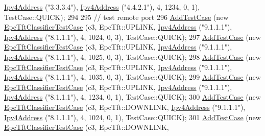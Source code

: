 \begin{DoxyCode}
      \hyperlink{classns3_1_1Ipv4Address}{Ipv4Address} (\textcolor{stringliteral}{"3.3.3.4"}), \hyperlink{classns3_1_1Ipv4Address}{Ipv4Address} (\textcolor{stringliteral}{"4.4.2.1"}),     4,     1234,     0,    1), 
      TestCase::QUICK);
294 
295   \textcolor{comment}{// test remote port}
296   \hyperlink{classns3_1_1TestCase_a3718088e3eefd5d6454569d2e0ddd835}{AddTestCase} (\textcolor{keyword}{new} \hyperlink{classEpcTftClassifierTestCase}{EpcTftClassifierTestCase} (c3, EpcTft::UPLINK,   
      \hyperlink{classns3_1_1Ipv4Address}{Ipv4Address} (\textcolor{stringliteral}{"9.1.1.1"}), \hyperlink{classns3_1_1Ipv4Address}{Ipv4Address} (\textcolor{stringliteral}{"8.1.1.1"}),     4,     1024,     0,    3), 
      TestCase::QUICK);
297   \hyperlink{classns3_1_1TestCase_a3718088e3eefd5d6454569d2e0ddd835}{AddTestCase} (\textcolor{keyword}{new} \hyperlink{classEpcTftClassifierTestCase}{EpcTftClassifierTestCase} (c3, EpcTft::UPLINK,   
      \hyperlink{classns3_1_1Ipv4Address}{Ipv4Address} (\textcolor{stringliteral}{"9.1.1.1"}), \hyperlink{classns3_1_1Ipv4Address}{Ipv4Address} (\textcolor{stringliteral}{"8.1.1.1"}),     4,     1025,     0,    3), 
      TestCase::QUICK);
298   \hyperlink{classns3_1_1TestCase_a3718088e3eefd5d6454569d2e0ddd835}{AddTestCase} (\textcolor{keyword}{new} \hyperlink{classEpcTftClassifierTestCase}{EpcTftClassifierTestCase} (c3, EpcTft::UPLINK,   
      \hyperlink{classns3_1_1Ipv4Address}{Ipv4Address} (\textcolor{stringliteral}{"9.1.1.1"}), \hyperlink{classns3_1_1Ipv4Address}{Ipv4Address} (\textcolor{stringliteral}{"8.1.1.1"}),     4,     1035,     0,    3), 
      TestCase::QUICK);
299   \hyperlink{classns3_1_1TestCase_a3718088e3eefd5d6454569d2e0ddd835}{AddTestCase} (\textcolor{keyword}{new} \hyperlink{classEpcTftClassifierTestCase}{EpcTftClassifierTestCase} (c3, EpcTft::UPLINK,   
      \hyperlink{classns3_1_1Ipv4Address}{Ipv4Address} (\textcolor{stringliteral}{"9.1.1.1"}), \hyperlink{classns3_1_1Ipv4Address}{Ipv4Address} (\textcolor{stringliteral}{"8.1.1.1"}),     4,     1234,     0,    1), 
      TestCase::QUICK);
300   \hyperlink{classns3_1_1TestCase_a3718088e3eefd5d6454569d2e0ddd835}{AddTestCase} (\textcolor{keyword}{new} \hyperlink{classEpcTftClassifierTestCase}{EpcTftClassifierTestCase} (c3, EpcTft::DOWNLINK, 
      \hyperlink{classns3_1_1Ipv4Address}{Ipv4Address} (\textcolor{stringliteral}{"9.1.1.1"}), \hyperlink{classns3_1_1Ipv4Address}{Ipv4Address} (\textcolor{stringliteral}{"8.1.1.1"}),     4,     1024,     0,    1), 
      TestCase::QUICK);
301   \hyperlink{classns3_1_1TestCase_a3718088e3eefd5d6454569d2e0ddd835}{AddTestCase} (\textcolor{keyword}{new} \hyperlink{classEpcTftClassifierTestCase}{EpcTftClassifierTestCase} (c3, EpcTft::DOWNLINK, 

\end{DoxyCode}
